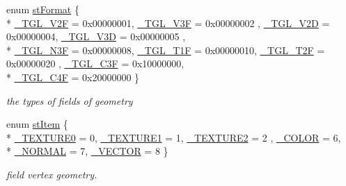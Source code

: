 \begin{DoxyCompactItemize}
enum \hyperlink{classcsad_1_1_mesh_acb32897739522133793f6cfe8564f780}{st\-Format} \{ \\*
\hyperlink{classcsad_1_1_mesh_acb32897739522133793f6cfe8564f780a5190f1b94505856d456f1d47d19deac6}{\-\_\-\-T\-G\-L\-\_\-\-V2\-F} = 0x00000001, 
\hyperlink{classcsad_1_1_mesh_acb32897739522133793f6cfe8564f780a5c0b3dcab62e79a2e6daa716f4dc7cd1}{\-\_\-\-T\-G\-L\-\_\-\-V3\-F} = 0x00000002
, \hyperlink{classcsad_1_1_mesh_acb32897739522133793f6cfe8564f780af221b582724c7091831ce91da22bc8f8}{\-\_\-\-T\-G\-L\-\_\-\-V2\-D} = 0x00000004, 
\hyperlink{classcsad_1_1_mesh_acb32897739522133793f6cfe8564f780ad47cabf22b9825c1f0ff6afa70a630ab}{\-\_\-\-T\-G\-L\-\_\-\-V3\-D} = 0x00000005
, \\*
\hyperlink{classcsad_1_1_mesh_acb32897739522133793f6cfe8564f780ae55d7cda49186c3c9e74990f82bb72a3}{\-\_\-\-T\-G\-L\-\_\-\-N3\-F} = 0x00000008, 
\hyperlink{classcsad_1_1_mesh_acb32897739522133793f6cfe8564f780a15428c085b8f3033148a9c2bc6e4db7a}{\-\_\-\-T\-G\-L\-\_\-T1\-F} = 0x00000010, 
\hyperlink{classcsad_1_1_mesh_acb32897739522133793f6cfe8564f780a9214381484568ecba6f1048ff526649c}{\-\_\-\-T\-G\-L\-\_\-T2\-F} = 0x00000020
, \hyperlink{classcsad_1_1_mesh_acb32897739522133793f6cfe8564f780a37d60c4a928dcc06f2b3d1fcf8e465b6}{\-\_\-\-T\-G\-L\-\_\-\-C3\-F} = 0x10000000, 
\\*
\hyperlink{classcsad_1_1_mesh_acb32897739522133793f6cfe8564f780a4bcd01e4a691dfdc1a12c5d170261c74}{\-\_\-\-T\-G\-L\-\_\-\-C4\-F} = 0x20000000
 \}
\begin{DoxyCompactList}\small\item\em the types of fields of geometry \end{DoxyCompactList}\item 
enum \hyperlink{classcsad_1_1_mesh_a3abde5863bf335c0575747d0d5761e19}{st\-Item} \{ \\*
\hyperlink{classcsad_1_1_mesh_a3abde5863bf335c0575747d0d5761e19a73bba428e4f7dade7f6961532116e7cf}{\-\_\-\-T\-E\-X\-T\-U\-R\-E0} = 0, 
\hyperlink{classcsad_1_1_mesh_a3abde5863bf335c0575747d0d5761e19aa5ddd01a77e8bc5ae9fa02e71ad30763}{\-\_\-\-T\-E\-X\-T\-U\-R\-E1} = 1, 
\hyperlink{classcsad_1_1_mesh_a3abde5863bf335c0575747d0d5761e19a74a1e5683692360cf0df911158ed27f2}{\-\_\-\-T\-E\-X\-T\-U\-R\-E2} = 2
, \hyperlink{classcsad_1_1_mesh_a3abde5863bf335c0575747d0d5761e19a627ddfa4a0e390500d46dd14f94527fa}{\-\_\-\-C\-O\-L\-O\-R} = 6, 
\\*
\hyperlink{classcsad_1_1_mesh_a3abde5863bf335c0575747d0d5761e19a80ab94ebc5c243bb96444d944fb36511}{\-\_\-\-N\-O\-R\-M\-A\-L} = 7, 
\hyperlink{classcsad_1_1_mesh_a3abde5863bf335c0575747d0d5761e19a306abe95d64e147789cdc1323895982c}{\-\_\-\-V\-E\-C\-T\-O\-R} = 8
 \}
\begin{DoxyCompactList}\small\item\em field vertex geometry. \end{DoxyCompactList}\end{DoxyCompactItemize}

